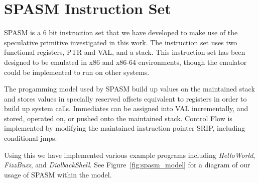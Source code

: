 \section{SPASM Instruction Set}
\label{appendix:spasm}
\renewcommand{\thefootnote}{\fnsymbol{footnote}}

SPASM is a 6 bit instruction set that we have developed to make use of the 
speculative primitive investigated in this work. The instruction set uses two 
functional registers, PTR and VAL, and a stack. This instruction set has been 
designed to be emulated in x86 and x86-64 environments, though the emulator 
could be implemented to run on other systems. 

The progamming model used by SPASM build up values on the maintained stack
and stores values in specially reserved offsets equivalent to registers 
in order to build up system calls. Immediates can be assigned into VAL
incrementally, and stored, operated on, or pushed onto the maintained
stack. Control Flow is implemented by modifying the maintained 
instruction pointer SRIP, including conditional jmps. 

Using this we have implemented various example programs including 
\textit{HelloWorld}, \textit{FizzBuzz}, and \textit{DialbackShell}.
See Figure~\ref{fig:spasm_model} for a diagram of our usage of SPASM 
within the \speculake model.



